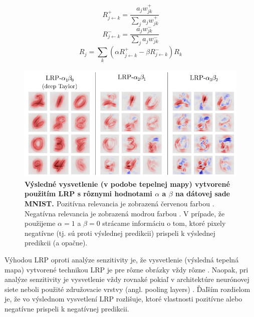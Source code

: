 
\begin{equation} 
    R_{j\leftarrow k}^{+} = \frac{a_j w_{j k}^+}{\sum_{j}^{} a_j w_{j k}^+}
    \label{eq:lrp_1}
\end{equation}
\begin{equation} 
    R_{j\leftarrow k}^{-} = \frac{a_j w_{j k}^-}{\sum_{j}^{} a_j w_{j k}^-}
    \label{eq:lrp_2}
\end{equation}
\begin{equation} 
    R_{j}=\sum_{k}^{} \left ( \alpha R_{j\leftarrow k}^{+} - \beta R_{j\leftarrow k}^{-} \right ) R_k
    \label{eq:lrp_3}
\end{equation}

\begin{figure}[h!]
\centering
\includegraphics[scale=0.5]{assets/images/lrp.png}
\caption{\textbf{Výsledné vysvetlenie (v podobe tepelnej mapy) vytvorené použitím LRP s rôznymi hodnotami $\alpha$ a $\beta$ na dátovej sade MNIST. \cite{montavon2018methods}} Pozitívna relevancia je zobrazená červenou farbou \cite{montavon2018methods}. Negatívna relevancia je zobrazená modrou farbou \cite{montavon2018methods}. V prípade, že použijeme $\alpha = 1$ a $\beta = 0$ strácame informáciu o tom, ktoré pixely negatívne (tj. sú proti výslednej predikcii) prispeli k výslednej predikcii (a opačne).}
\label{fig:lrp}
\end{figure}

Výhodou LRP oproti analýze senzitivity je, že vysvetlenie (výsledná tepelná mapa) vytvorené technikou LRP je pre rôzne obrázky vždy rôzne \cite{Muller_Samek_Montavon_Lapuschkin_Arras}. Naopak, pri analýze senzitivity je vysvetlenie vždy rovnaké pokiaľ v architektúre neurónovej siete neboli použité združovacie vrstvy (angl. pooling layers) \cite{Muller_Samek_Montavon_Lapuschkin_Arras}. Ďaľším rozdielom je, že vo výslednom vysvetlení LRP rozlišuje, ktoré vlastnosti pozitívne alebo negatívne prispeli k negatívnej predikcii.


